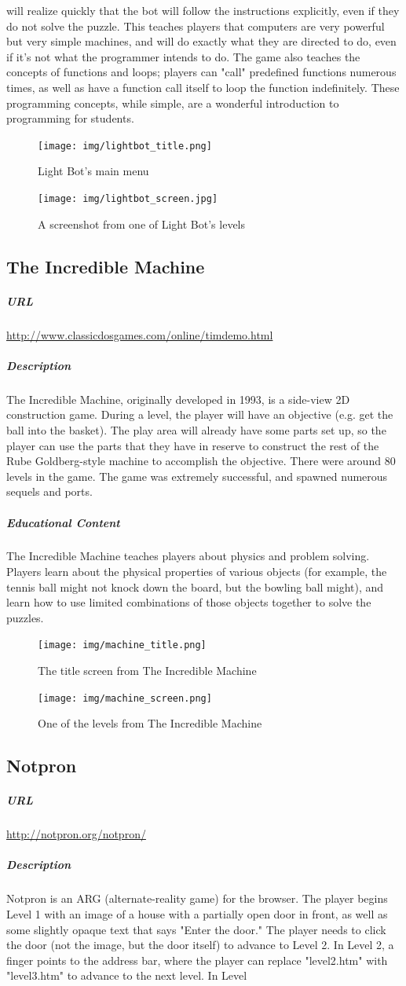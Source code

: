 will realize quickly that the bot will follow the instructions explicitly, even if they do not solve the puzzle. This teaches players that computers are very powerful but very simple machines, and will do exactly what they are directed to do, even if it's not what the programmer intends to do. The game also teaches the concepts of functions and loops; players can "call" predefined functions numerous times, as well as have a function call itself to loop the function indefinitely. These programming concepts, while simple, are a wonderful introduction to programming for students. \begin{figure}[h!]\centering \texttt{[image: img/lightbot\_title.png]}\caption{Light Bot's main menu}\end{figure}\begin{figure}[h!]\centering \texttt{[image: img/lightbot\_screen.jpg]}\caption{A screenshot from one of Light Bot's levels}\end{figure}\newpage\subsection{The Incredible Machine}\subparagraph{URL}\url{http://www.classicdosgames.com/online/timdemo.html}\subparagraph{Description}The Incredible Machine, originally developed in 1993, is a side-view 2D construction game. During a level, the player will have an objective (e.g. get the ball into the basket). The play area will already have some parts set up, so the player can use the parts that they have in reserve to construct the rest of the Rube Goldberg-style machine to accomplish the objective. There were around 80 levels in the game. The game was extremely successful, and spawned numerous sequels and ports.\subparagraph{Educational Content}The Incredible Machine teaches players about physics and problem solving. Players learn about the physical properties of various objects (for example, the tennis ball might not knock down the board, but the bowling ball might), and learn how to use limited combinations of those objects together to solve the puzzles. \begin{figure}[h!]\centering \texttt{[image: img/machine\_title.png]}\caption{The title screen from The Incredible Machine}\end{figure}\begin{figure}[h!]\centering \texttt{[image: img/machine\_screen.png]}\caption{One of the levels from The Incredible Machine}\end{figure}\newpage\subsection{Notpron}\subparagraph{URL}\url{http://notpron.org/notpron/}\subparagraph{Description}Notpron is an ARG (alternate-reality game) for the browser. The player begins Level 1 with an image of a house with a partially open door in front, as well as some slightly opaque text that says "Enter the door." The player needs to click the door (not the image, but the door itself) to advance to Level 2. In Level 2, a finger points to the address bar, where the player can replace "level2.htm" with "level3.htm" to advance to the next level. In Level 